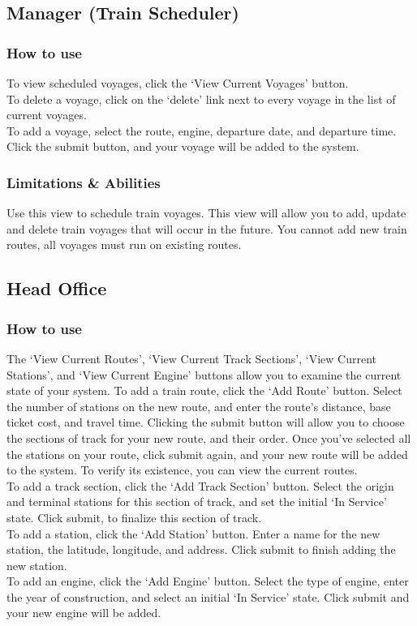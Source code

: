 \documentclass[letter]{article}
\begin{document}
\subsection{Manager (Train Scheduler)}
\subsubsection{How to use}
To view scheduled voyages, click the `View Current Voyages' button. \\
To delete a voyage, click on the `delete' link next to every voyage in the list of current voyages. \\
To add a voyage, select the route, engine, departure date, and departure time. Click the submit button, and your voyage will be added to the system.
\subsubsection{Limitations \& Abilities}
Use this view to schedule train voyages. This view will allow you to add, update and delete train voyages that will occur in the future. You cannot add new train routes, all voyages must run on existing routes. 


\subsection{Head Office}
\subsubsection{How to use}
The `View Current Routes', `View Current Track Sections', `View Current Stations', and `View Current Engine' buttons allow you to examine the current state of your system.
To add a train route, click the `Add Route' button. Select the number of stations on the new route, and enter the route's distance, base ticket cost, and travel time. Clicking the submit button will allow you to choose the sections of track for your new route, and their order. Once you've selected all the stations on your route, click submit again, and your new route will be added to the system. To verify its existence, you can view the current routes.\\
To add a track section, click the `Add Track Section' button. Select the origin and terminal stations for this section of track, and set the initial `In Service' state. Click submit, to finalize this section of track. \\
To add a station, click the `Add Station' button. Enter a name for the new station, the latitude, longitude, and address. Click submit to finish adding the new station. \\
To add an engine, click the `Add Engine' button. Select the type of engine, enter the year of construction, and select an initial `In Service' state. Click submit and your new engine will be added.
\end{document}
